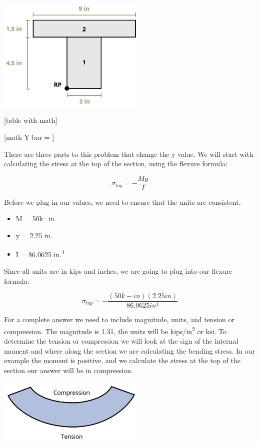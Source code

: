 \documentclass[
  letterpaper,
  DIV=11,
  numbers=noendperiod]{scrreprt}
\begin{document}
\begin{tcolorbox}
\begin{center}
\includegraphics[width=2.8125in,height=\textheight]{images/CH9 PNGs/Example 9.1 part 3.png}
\end{center}

{[}table with math{]}

{[}math Y bar = {]}

There are three parts to this problem that change the y value. We will
start with calculating the stress at the top of the section, using the
flexure formula:

\[
\sigma_{t o p}=-\frac{M y}{I}
\]

Before we plug in our values, we need to ensure that the units are
consistent.

\begin{itemize}
\item
  M = 50k·in.
\item
  y = 2.25 in.
\item
  I = 86.0625 in.\textsuperscript{4}
\end{itemize}

Since all units are in kips and inches, we are going to plug into our
flexure formula:

\[
\sigma_{t o p}=-\frac{(50 k-i n)(2.25 i n)}{86.0625 i n^4}
\]

For a complete answer we need to include magnitude, units, and tension
or compression. The magnitude is 1.31, the units will be
kips/in\textsuperscript{2} or ksi. To determine the tension or
compression we will look at the sign of the internal moment and where
along the section we are calculating the bending stress. In our example
the moment is positive, and we calculate the stress at the top of the
section our answer will be in compression.

\begin{center}
\includegraphics[width=2.79167in,height=\textheight]{images/CH9 PNGs/Example 9.1 part 4.png}
\end{center}


\end{tcolorbox}
\end{document}
